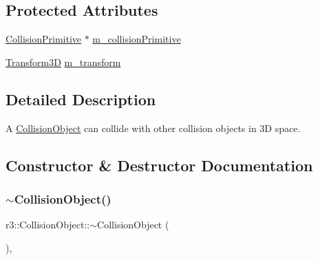 \subsection*{Protected Attributes}
\begin{DoxyCompactItemize}
\item 
\mbox{\hyperlink{classr3_1_1_collision_primitive}{Collision\+Primitive}} $\ast$ \mbox{\hyperlink{classr3_1_1_collision_object_afa62ecdda20144d43f9fcf72d56642d6}{m\+\_\+collision\+Primitive}}
\item 
\mbox{\hyperlink{classr3_1_1_transform3_d}{Transform3D}} \mbox{\hyperlink{classr3_1_1_collision_object_a2ed717150a250f1b81e23ba7e5431542}{m\+\_\+transform}}
\end{DoxyCompactItemize}


\subsection{Detailed Description}
A \mbox{\hyperlink{classr3_1_1_collision_object}{Collision\+Object}} can collide with other collision objects in 3D space. 

\subsection{Constructor \& Destructor Documentation}
\mbox{\label{classr3_1_1_collision_object_a26f7c8a9adb08718c98dce736cc89830}} 
\subsubsection{\texorpdfstring{$\sim$\+Collision\+Object()}{~CollisionObject()}}
{\footnotesize\ttfamily r3\+::\+Collision\+Object\+::$\sim$\+Collision\+Object (\begin{DoxyParamCaption}{ }\end{DoxyParamCaption})\hspace{0.3cm}{\ttfamily [virtual]}, {\ttfamily [default]}}

\mbox{\label{classr3_1_1_collision_object_ad664d1dd3a03f183c46c6b7ba7327cfd}} 
